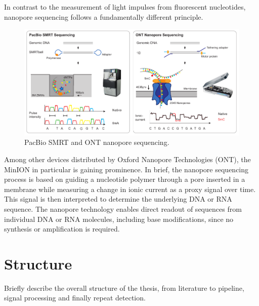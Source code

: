 In contrast to the measurement of light impulses from fluorescent nucleotides, nanopore sequencing follows a fundamentally different principle.

\begin{figure}[h]
	\centering
	\includegraphics[width=1.0\textwidth]{figures/intro/long_read.pdf}
	\captionsetup{format=plain}
	\caption[Long read sequencing]{PacBio SMRT and ONT nanopore sequencing.}
	\label{fig:intro:longread}
\end{figure}


Among other devices distributed by Oxford Nanopore Technologies (ONT), the MinION in particular is gaining prominence. In brief, the nanopore sequencing process is based on guiding a nucleotide polymer through a pore inserted in a membrane while measuring a change in ionic current as a proxy signal over time. This signal is then interpreted to determine the underlying DNA or RNA sequence. The nanopore technology enables direct readout of sequences from individual DNA or RNA molecules, including base modifications, since no synthesis or amplification is required.




\section{Structure}
\label{sec:intro:structure}

Briefly describe the overall structure of the thesis, from literature to pipeline, signal processing and finally repeat detection.


